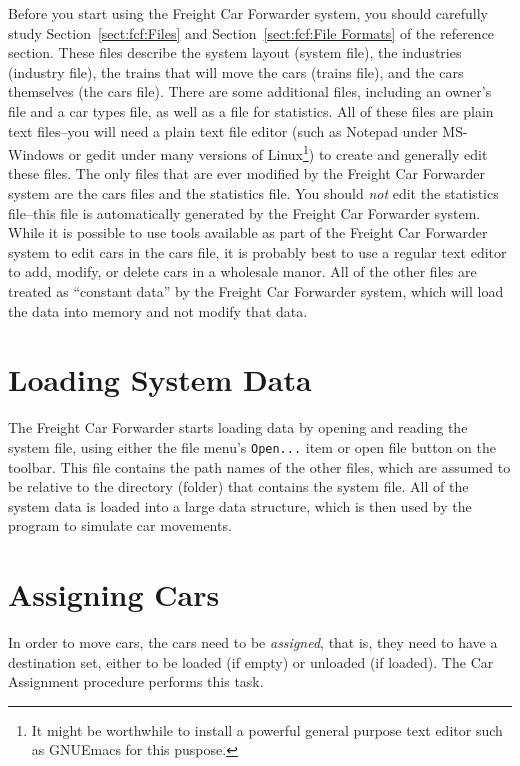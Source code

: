 Before you start using the Freight Car Forwarder system, you should
carefully study Section~\ref{sect:fcf:Files} and 
Section~\ref{sect:fcf:File Formats} of the reference section.   These
files describe the system layout (system file), the industries
(industry file), the trains that will move the cars (trains file), and
the cars themselves (the cars file).  There are some additional files,
including an owner's file and a car types file, as well as a file for
statistics.  All of these files are plain text files--you will need a
plain text file editor (such as Notepad under MS-Windows or gedit under
many versions of Linux\footnote{It might be worthwhile to install a
powerful general purpose text editor such as GNUEmacs for this
puspose.}) to create and generally edit these files. The only files
that are ever modified by the Freight Car Forwarder system are the cars
files and the statistics file. You should \emph{not} edit the statistics
file--this file is automatically generated by the Freight Car Forwarder
system.  While it is possible to use tools available as part of the
Freight Car Forwarder system to edit cars in the cars file, it is
probably best to use a regular text editor to add, modify, or delete
cars in a wholesale manor.  All of the other files are treated as
``constant data'' by the Freight Car Forwarder system, which will load
the data into memory and not modify that data.

\section{Loading System Data}

The Freight Car Forwarder starts loading data by opening and reading
the system file, using either the file menu's \verb=Open...= item or open file
button on the toolbar.  This file contains the path names of the other
files, which are assumed to be relative to the directory (folder) that
contains the system file.  All of the system data is loaded into a
large data structure, which is then used by the program to simulate car
movements.

\section{Assigning Cars}

  In order to move cars, the cars need to be \emph{assigned}, that is, they
need to have a destination set, either to be loaded (if empty) or
unloaded (if loaded).  The Car Assignment procedure performs this task.


